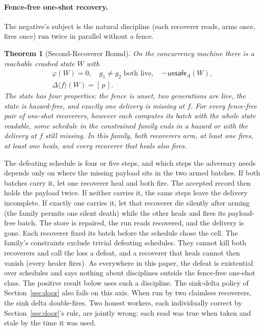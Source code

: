 \documentclass[sigplan,10pt]{acmart}
\theoremstyle{plain}
\newtheorem{theorem}{Theorem}
\theoremstyle{definition}
\newcommand{\unsafe}{\mathsf{unsafe}}
\newcommand{\sdelta}{\Delta}               %
\begin{document}
\paragraph{Fence-free one-shot recovery.}
The negative's subject is the natural discipline (each recoverer
reads, arms once, fires once) run twice in parallel without a fence.

\begin{theorem}[Second-Recoverer Bound]\label{thm:second}
On the concurrency machine there is a reachable crashed state $W$
with
\[
  \begin{gathered}
  \varphi(W) = 0, \quad g_1 \neq g_2 \text{ both live}, \quad
  \neg\,\unsafe_A(W),\\[-2pt]
  \sdelta\langle f\rangle(W) = [\,p\,].
  \end{gathered}
\]
The state has four properties: the fence is unset, two generations are
live, the state is hazard-free, and exactly one delivery is missing at
$f$. For every
fence-free pair of one-shot recoverers, however each computes its batch
with the whole state readable, some schedule in the constrained family
ends in a hazard or with the delivery at $f$ still missing. In this family,
both recoverers arm, at least one fires, at least one heals, and every
recoverer that heals also fires.
\end{theorem}

The defeating schedule is four or five steps, and which steps the
adversary needs depends only on where the missing payload sits in the two
armed batches. If both batches carry it, let one recoverer heal and
both fire. The accepted record then holds the payload twice. If neither
carries it, the same steps leave the delivery incomplete. If exactly one
carries it, let that recoverer die silently after arming (the family
permits one silent death) while the other heals and fires its
payload-free batch. The store is repaired, the run reads recovered, and
the delivery is gone.
Each recoverer fixed its batch before the schedule chose the cell. The
family's constraints exclude trivial defeating schedules. They cannot
kill both recoverers and call the loss a defeat, and a recoverer that heals
cannot then vanish (every healer fires). As everywhere in this paper,
the defeat is existential over schedules and says nothing about
disciplines outside the fence-free one-shot class. The positive result
below uses such a discipline. The sink-delta policy of
Section~\ref{sec:door} also fails on this axis. When run by two claimless
recoverers, the sink delta double-fires. Two honest workers, each
individually correct by Section~\ref{sec:door}'s rule, are jointly
wrong: each read was true when taken and stale by the time it was
used.
\end{document}

